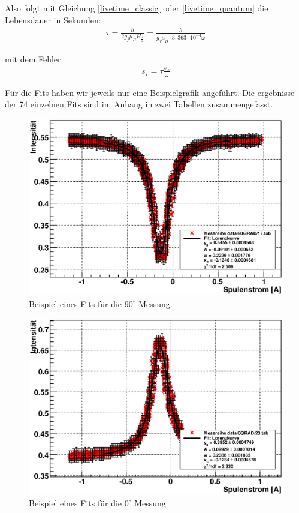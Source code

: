 \documentclass[12pt]{article}
\begin{document}
Also folgt mit Gleichung \ref{livetime_classic} oder \ref{livetime_quantum} die Lebensdauer in Sekunden:
\begin{align}
 \tau = \frac{\hbar}{2g_j \mu_B H_{\frac{1}{2}}} = \frac{\hbar}{g_j \mu_B\cdot 3,363\cdot 10^{-4} \omega}
\end{align}

mit dem Fehler:
\begin{align}
 s_{\tau}=\tau \frac{s_{\omega}}{\omega}
\end{align}

Für die Fits haben wir jeweils nur eine Beispielgrafik angeführt. Die ergebnisse der 74 einzelnen Fits sind im Anhang in zwei Tabellen zusammengefasst.

\begin{figure}[H]  
\centering
\includegraphics[width=0.9\linewidth]{pictures/9017eps.eps}
\caption{Beispiel eines Fits für die $90^\circ$ Messung}
\end{figure}

\begin{figure}[H]  
\centering
\includegraphics[width=0.9\linewidth]{pictures/023eps.eps}
\caption{Beispiel eines Fits für die $0^\circ$ Messung}
\end{figure}
\end{document}
